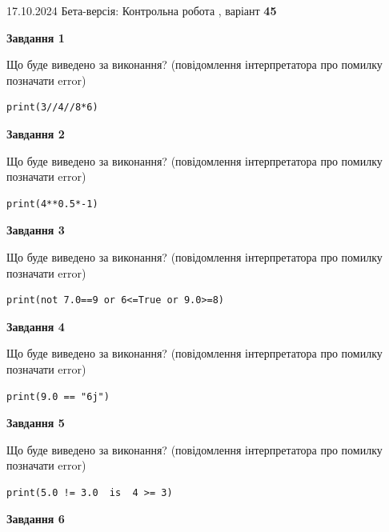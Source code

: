 \documentclass[12pt, ukrainian]{article}
\begin{document}
{\Large{17.10.2024 Бета-версія: Контрольна робота , варіант  \No \textbf { 45 }\par}}
{
\begin {large}
{\begin {center}\textbf{Завдання 1}\end {center}}

Що буде виведено за виконання? (повідомлення інтерпретатора про помилку позначати error)\par
\begin{verbatim}
print(3//4//8*6)
\end{verbatim}

{\begin {center}\textbf{Завдання 2}\end {center}}

Що буде виведено за виконання? (повідомлення інтерпретатора про помилку позначати error)\par
\begin{verbatim}
print(4**0.5*-1)
\end{verbatim}

{\begin {center}\textbf{Завдання 3}\end {center}}

Що буде виведено за виконання? (повідомлення інтерпретатора про помилку позначати error)\par
\begin{verbatim}
print(not 7.0==9 or 6<=True or 9.0>=8)
\end{verbatim}

{\begin {center}\textbf{Завдання 4}\end {center}}

Що буде виведено за виконання? (повідомлення інтерпретатора про помилку позначати error)\par
\begin{verbatim}
print(9.0 == "6j")
\end{verbatim}

{\begin {center}\textbf{Завдання 5}\end {center}}

Що буде виведено за виконання? (повідомлення інтерпретатора про помилку позначати error)\par
\begin{verbatim}
print(5.0 != 3.0  is  4 >= 3)
\end{verbatim}

{\begin {center}\textbf{Завдання 6}\end {center}}


\end{large}}
\end{document}
